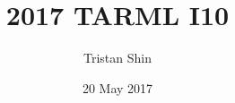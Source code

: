 \documentclass[a4paper, 12pt]{article}
\title{2017 TARML I10}
\author{Tristan Shin}
\date{20 May 2017}
\begin{document}
\maketitle



\hrulefill

\begin{solution}

\end{solution}
\end{document}
